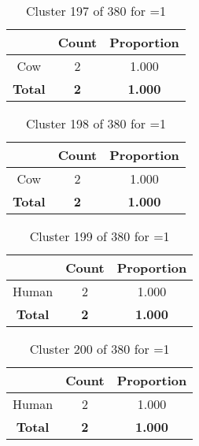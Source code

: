 \begin{table}[ht!]
\centering
\begin{tabular}{|c|c|c|}
\hline
\bf \Spec{} &\bf Count &\bf Proportion\\ \hline \hline
Cow & 2 & 1.000\\ \hline
\hline
\bf Total & \bf 2 & \bf 1.000\\ \hline
\end{tabular}
\label{tab:cluster:197:1}
\caption{Cluster 197 of 380 for \minneigh{}=1}
\end{table}

\begin{table}[ht!]
\centering
\begin{tabular}{|c|c|c|}
\hline
\bf \Spec{} &\bf Count &\bf Proportion\\ \hline \hline
Cow & 2 & 1.000\\ \hline
\hline
\bf Total & \bf 2 & \bf 1.000\\ \hline
\end{tabular}
\label{tab:cluster:198:1}
\caption{Cluster 198 of 380 for \minneigh{}=1}
\end{table}

\begin{table}[ht!]
\centering
\begin{tabular}{|c|c|c|}
\hline
\bf \Spec{} &\bf Count &\bf Proportion\\ \hline \hline
Human & 2 & 1.000\\ \hline
\hline
\bf Total & \bf 2 & \bf 1.000\\ \hline
\end{tabular}
\label{tab:cluster:199:1}
\caption{Cluster 199 of 380 for \minneigh{}=1}
\end{table}

\clearpage
\begin{table}[ht!]
\centering
\begin{tabular}{|c|c|c|}
\hline
\bf \Spec{} &\bf Count &\bf Proportion\\ \hline \hline
Human & 2 & 1.000\\ \hline
\hline
\bf Total & \bf 2 & \bf 1.000\\ \hline
\end{tabular}
\label{tab:cluster:200:1}
\caption{Cluster 200 of 380 for \minneigh{}=1}
\end{table}

